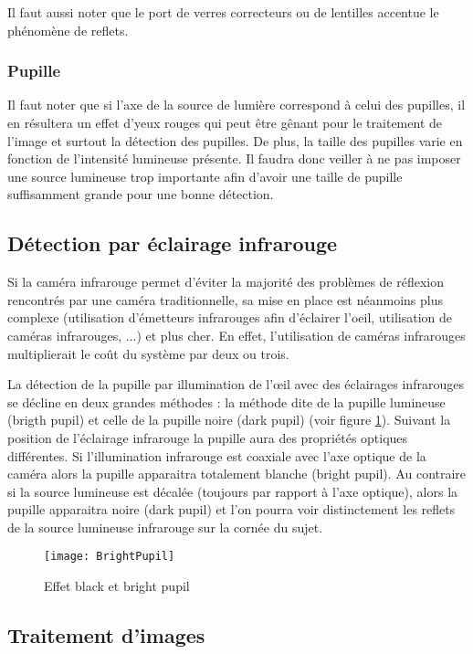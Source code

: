 Il faut aussi noter que le port de verres correcteurs ou de lentilles accentue le phénomène de reflets.

\subsubsection{Pupille}

Il faut noter que si l’axe de la source de lumière correspond à celui des pupilles, il en résultera un effet d’yeux rouges qui peut être gênant pour le traitement de l’image et surtout la détection des pupilles. De plus, la taille des pupilles varie en fonction de l’intensité lumineuse présente. Il faudra donc veiller à ne pas imposer une source lumineuse trop importante afin d’avoir une taille de pupille suffisamment grande pour une bonne détection.

\subsection{Détection par éclairage infrarouge}
\label{EclInfra}

Si la caméra infrarouge permet d’éviter la majorité des problèmes de réflexion rencontrés par une caméra traditionnelle, sa mise en place est néanmoins plus complexe (utilisation d’émetteurs infrarouges afin d'éclairer l'oeil, utilisation de caméras infrarouges, ...) et plus cher. En effet, l'utilisation de caméras infrarouges multiplierait le coût du système par deux ou trois.

La détection de la pupille par illumination de l’œil avec des éclairages infrarouges se décline en deux grandes méthodes : la méthode dite de la pupille lumineuse (brigth pupil) et celle de la pupille noire (dark pupil) (voir figure \ref{fig:BrightPupil}). Suivant la position de l’éclairage infrarouge la pupille aura des propriétés optiques différentes. Si l’illumination infrarouge est coaxiale avec l’axe optique de la caméra alors la pupille apparaitra totalement blanche (bright pupil). Au contraire si la source lumineuse est décalée (toujours par rapport à l’axe optique), alors la pupille apparaitra noire (dark pupil) et l’on pourra voir distinctement les reflets de la source lumineuse infrarouge sur la cornée du sujet.

\begin{figure}[H]
  \centering
  \texttt{[image: BrightPupil]}
  \caption{Effet black et bright pupil}
  \label{fig:BrightPupil}
\end{figure}

\subsection{Traitement d’images}

